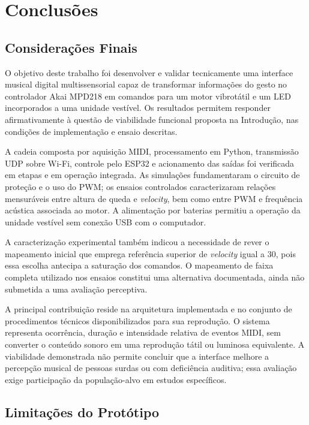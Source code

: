 \chapter{Conclusões}

\section{Considerações Finais}
\label{sec:consideracoes_finais}

O objetivo deste trabalho foi desenvolver e validar tecnicamente uma interface musical digital multissensorial capaz de transformar informações do gesto no controlador Akai MPD218 em comandos para um motor vibrotátil e um LED incorporados a uma unidade vestível. Os resultados permitem responder afirmativamente à questão de viabilidade funcional proposta na Introdução, nas condições de implementação e ensaio descritas.

A cadeia composta por aquisição MIDI, processamento em Python, transmissão UDP sobre Wi-Fi, controle pelo ESP32 e acionamento das saídas foi verificada em etapas e em operação integrada. As simulações fundamentaram o circuito de proteção e o uso do PWM; os ensaios controlados caracterizaram relações mensuráveis entre altura de queda e \textit{velocity}, bem como entre PWM e frequência acústica associada ao motor. A alimentação por baterias permitiu a operação da unidade vestível sem conexão USB com o computador.

A caracterização experimental também indicou a necessidade de rever o mapeamento inicial que emprega referência superior de \textit{velocity} igual a 30, pois essa escolha antecipa a saturação dos comandos. O mapeamento de faixa completa utilizado nos ensaios constitui uma alternativa documentada, ainda não submetida a uma avaliação perceptiva.

A principal contribuição reside na arquitetura implementada e no conjunto de procedimentos técnicos disponibilizados para sua reprodução. O sistema representa ocorrência, duração e intensidade relativa de eventos MIDI, sem converter o conteúdo sonoro em uma reprodução tátil ou luminosa equivalente. A viabilidade demonstrada não permite concluir que a interface melhore a percepção musical de pessoas surdas ou com deficiência auditiva; essa avaliação exige participação da população-alvo em estudos específicos.

\section{Limitações do Protótipo}
\label{sec:limitacoes_prototipo}

